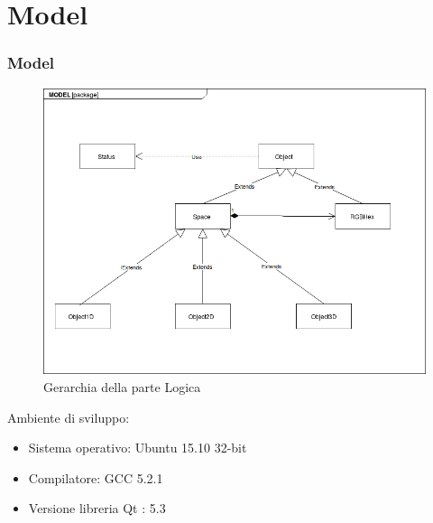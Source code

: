 \documentclass[10pt]{beamer}
\begin{document}
\section{Model}
\begin{frame}
\frametitle{Model}

   \FloatBarrier
   \begin{figure}[ht]
   \centering
   \includegraphics[scale=0.20]{Gerarchia.png}
   \caption{Gerarchia della parte Logica}
\end{figure}

Ambiente di sviluppo:
\begin{itemize}
\item Sistema operativo: Ubuntu 15.10 32-bit
\item Compilatore: GCC 5.2.1
\item Versione libreria Qt : 5.3
\end{itemize}


\end{frame}

\end{document}
